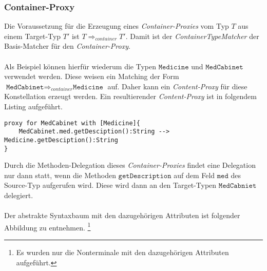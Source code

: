 \documentclass[a4paper,12pt]{article}
\begin{document}
\subsubsection{Container-Proxy}
Die Voraussetzung für die Erzeugung eines \emph{Container-Proxies} vom Typ $T$ aus einem Target-Typ $T'$ ist $T \Rightarrow_{container} T'$. Damit ist der \emph{ContainerTypeMatcher} der Basis-Matcher für den \emph{Container-Proxy}.\\\\
Als Beispiel können hierfür wiederum die Typen $\texttt{Medicine}$ und $\texttt{MedCabinet}$ verwendet werden. Diese weisen ein Matching der Form $\texttt{MedCabinet} \Rightarrow_{container} \texttt{Medicine}$ auf. Daher kann ein \emph{Content-Proxy} für diese Konstellation erzeugt werden. Ein resultierender \emph{Content-Proxy} ist in folgendem Listing aufgeführt.
\begin{lstlisting}[style = dsl]
proxy for MedCabinet with [Medicine]{
	MedCabinet.med.getDesciption():String --> Medicine.getDesciption():String
}
\end{lstlisting}
Durch die Methoden-Delegation dieses \emph{Container-Proxies} findet eine Delegation nur dann statt, wenn die Methoden $\texttt{getDescription}$ auf dem Feld $\texttt{med}$ des Source-Typ aufgerufen wird. Diese wird dann an den Target-Typen $\texttt{MedCabniet}$ delegiert.\\\\
Der abstrakte Syntaxbaum mit den dazugehörigen Attributen ist folgender Abbildung zu entnehmen. \footnote{Es wurden nur die Nonterminale mit den dazugehörigen Attributen aufgeführt.}
\begin{figure}

\end{figure}
\end{document}
